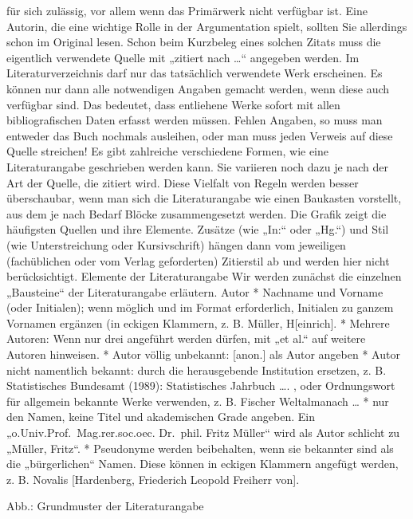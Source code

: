 \documentclass[]{book}
\theoremstyle{definition}
\theoremstyle{definition}
\theoremstyle{definition}
\theoremstyle{remark}
\begin{document}
für sich zulässig, vor allem wenn das Primärwerk nicht verfügbar ist.
Eine Autorin, die eine wichtige Rolle in der Argumentation spielt,
sollten Sie allerdings schon im Original lesen. Schon beim Kurzbeleg
eines solchen Zitats muss die eigentlich verwendete Quelle mit „zitiert
nach \ldots{}`` angegeben werden. Im Literaturverzeichnis darf nur das
tatsächlich verwendete Werk erscheinen. Es können nur dann alle
notwendigen Angaben gemacht werden, wenn diese auch verfügbar sind. Das
bedeutet, dass entliehene Werke sofort mit allen bibliografischen Daten
erfasst werden müssen. Fehlen Angaben, so muss man entweder das Buch
nochmals ausleihen, oder man muss jeden Verweis auf diese Quelle
streichen! Es gibt zahlreiche verschiedene Formen, wie eine
Literaturangabe geschrieben werden kann. Sie variieren noch dazu je nach
der Art der Quelle, die zitiert wird. Diese Vielfalt von Regeln werden
besser überschaubar, wenn man sich die Literaturangabe wie einen
Baukasten vorstellt, aus dem je nach Bedarf Blöcke zusammengesetzt
werden. Die Grafik zeigt die häufigsten Quellen und ihre Elemente.
Zusätze (wie „In:`` oder „Hg.``) und Stil (wie Unterstreichung oder
Kursivschrift) hängen dann vom jeweiligen (fachüblichen oder vom Verlag
geforderten) Zitierstil ab und werden hier nicht berücksichtigt.
Elemente der Literaturangabe Wir werden zunächst die einzelnen
„Bausteine`` der Literaturangabe erläutern. Autor * Nachname und Vorname
(oder Initialen); wenn möglich und im Format erforderlich, Initialen zu
ganzem Vornamen ergänzen (in eckigen Klammern, z. B. Müller,
H{[}einrich{]}. * Mehrere Autoren: Wenn nur drei angeführt werden
dürfen, mit „et al.`` auf weitere Autoren hinweisen. * Autor völlig
unbekannt: {[}anon.{]} als Autor angeben * Autor nicht namentlich
bekannt: durch die herausgebende Institution ersetzen, z. B.
Statistisches Bundesamt (1989): Statistisches Jahrbuch \ldots{}. , oder
Ordnungswort für allgemein bekannte Werke verwenden, z. B. Fischer
Weltalmanach \ldots{} * nur den Namen, keine Titel und akademischen
Grade angeben. Ein „o.Univ.Prof.~Mag.rer.soc.oec. Dr.~phil. Fritz
Müller`` wird als Autor schlicht zu „Müller, Fritz``. * Pseudonyme
werden beibehalten, wenn sie bekannter sind als die „bürgerlichen``
Namen. Diese können in eckigen Klammern angefügt werden, z. B. Novalis
{[}Hardenberg, Friederich Leopold Freiherr von{]}.

Abb.: Grundmuster der Literaturangabe
\end{document}
